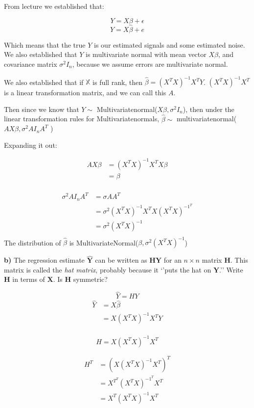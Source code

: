 \documentclass[11pt]{article}
\begin{document}
From lecture we established that: 

\[
Y = X \beta + \epsilon
\]
\[
Y = X \hat \beta + e
\]

Which means that the true $Y$ is our estimated signals and some estimated noise. We also established that $Y$ is multivariate normal with mean vector $X \beta$, and covariance matrix $\sigma^{2}I_{n}$, because we assume errors are multivariate normal.

We also established that if $\mathbb{X}$ is full rank, then $\hat \beta = (X^{T}X)^{-1}X^{T}Y$. $(X^{T}X)^{-1}X^{T}$ is a linear transformation matrix, and we can call this $A$. 

Then since we know that $Y \sim $ Multivariatenormal($X\beta, \sigma^{2}I_{n}$), then under the linear transformation rules for Multivariatenormals, $\hat \beta \sim $  multivariatenormal($A X\beta, \sigma^{2} AI_{n}A^{T} $ )

Expanding it out: 

\begin{align*}
AX\beta &= (X^{T}X)^{-1} X^{T}X \beta  \\
&= \beta \\
\end{align*}


\begin{align*}
	\sigma^{2}AI_{n}A^{T} &= \sigma A A^{T} \\
	&= \sigma^{2} (X^{T}X)^{-1}X^{T} X (X^{T}X)^{-1^{T}} \\
	&= \sigma^{2} (X^{T}X)^{-1} \\
\end{align*}
The distribution of $\hat \beta$ is MultivariateNormal($\beta, \sigma^{2}(X^{T}X)^{-1}$) 

\textbf{b)} The regression estimate \(\hat{\mathbf{Y}}\) can be written
as \(\mathbf{HY}\) for an \(n \times n\) matrix \(\mathbf{H}\). This
matrix is called the \emph{hat matrix}, probably because it `'puts the
hat on \(\mathbf{Y}\).'' Write \(\mathbf{H}\) in terms of
\(\mathbf{X}\). Is \(\mathbf{H}\) symmetric?

$$
	\hat Y = HY
$$
\begin{align*}
	\hat Y &= X \hat \beta \\
	&= X (X^{T}X)^{-1}X^{T}Y \\
\end{align*}


\[
H = X(X^{T}X)^{-1}X^{T}
\]

\begin{align*}
	H^{T} &= \left( X(X^{T}X)^{-1}X^{T} \right)^{T}  \\
	      &= X^{T^{T}} (X^{T}X)^{-1^{T}}X^{T} \\
&= X^{T} (X^{T}X)^{-1}X^{T} \\
\end{align*}
\end{document}

